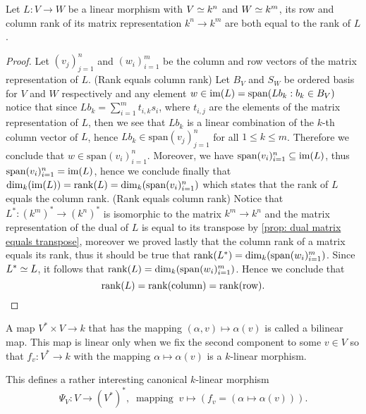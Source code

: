 \begin{proposition}
  \label{prop: column and row rank equal the rank}
  Let \(L: V \to W\) be a linear morphism with \(V \simeq k^n\) and \(W \simeq
  k^m\), its row and column rank of its matrix representation \(k^n \to k^m\)
  are both equal to the rank of \(L\).
\end{proposition}

\begin{proof}
  Let \((v_j)_{j=1}^n\) and  \((w_i)_{i=1}^m\) be the column and row vectors of
  the matrix representation of \(L\).
  (Rank equals column rank) Let \(B_V\) and \(S_W\) be ordered basis for \(V\)
  and \(W\) respectively and any element \(w \in \operatorname{im}(L) = \mathrm{span}(Lb_k :
  b_k \in B_V)\) notice that since \(Lb_k = \sum_{i=1}^m t_{i, k} s_i\), where
  \(t_{i,j}\) are the elements of the matrix representation of \(L\), then we
  see that \(Lb_k\) is a linear combination of the \(k\)-th column vector of
  \(L\), hence \(Lb_k \in \mathrm{span}(v_j)_{j=1}^n\) for all \(1 \leq k \leq
  m\). Therefore we conclude that \(w \in \mathrm{span}(v_i)_{i=1}^n\).
  Moreover, we have \(\mathrm{span}(v_i)_{i=1}^n \subseteq \operatorname{im}(L)\), thus
  \(\mathrm{span}(v_i)_{i=1}^n = \operatorname{im}(L)\), hence we conclude finally that
  \(\dim_k(\operatorname{im}(L)) = \operatorname{rank}(L) = \dim_k(\mathrm{span}(v_i)_{i=1}^n)\) which
  states that the rank of \(L\) equals the column rank.
  (Rank equals column rank) Notice that \(L^\ast : (k^m)^\ast \to (k^n)^\ast\)
  is isomorphic to the matrix \(k^m \to k^n\) and the matrix representation of
  the dual of \(L\) is equal to its transpose by \ref{prop: dual matrix equals
  transpose}, moreover we proved lastly that the column rank of a matrix equals
  its rank, thus it should be true that \(\operatorname{rank}(L^\ast) =
  \dim_k(\mathrm{span}(w_i)_{i=1}^m)\). Since \(L^\ast \simeq L\), it follows that
  \(\operatorname{rank}(L) = \dim_k(\mathrm{span}(w_i)_{i=1}^m)\). Hence we conclude that
  \[
    \operatorname{rank}(L) = \operatorname{rank}(\text{column}) = \operatorname{rank}(\text{row}).
  \]
\end{proof}

\begin{definition}\label{def: bilinear map}
  A map \(V^\ast \times V \to k\) that has the mapping \((\alpha, v) \mapsto
  \alpha(v)\) is called a bilinear map. This map is linear only when we fix the
  second component to some \(v \in V\) so that \(f_v: V^\ast \to k\) with the
  mapping \(\alpha \mapsto \alpha(v)\) is a \(k\)-linear morphism.
\end{definition}

This defines a rather interesting canonical \(k\)-linear morphism
\[
  \Psi_V : V \to (V^\ast)^\ast,\
  \text{ mapping }\ v \mapsto (f_v = (\alpha \mapsto \alpha(v))).
\]

